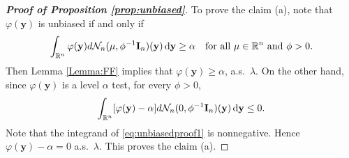 \documentclass[11pt]{article}
\DeclareMathOperator{\myRank}{Rank}
\DeclareMathOperator{\myE}{E}
\newcommand{\By}{\mathbf{y}}    \newcommand{\Bz}{\mathbf{z}}
\theoremstyle{plain}
\theoremstyle{definition}
\theoremstyle{remark}
\begin{document}
\begin{proof}[\textbf{Proof of Proposition \ref{prop:unbiased}}]
    
    To prove the claim (a), 
    note that $\varphi(\By)$ is unbiased if and only if
    \begin{equation*}
        \int_{\mathbb R^n} \varphi(\By) d\mathcal N_n (\mu,\phi^{-1} \BI_n) (\By) \,\mathrm{d} \By\geq \alpha
        \quad \text{for all $\mu\in \mathbb R^n$ and $\phi>0$}.
    \end{equation*}
    Then Lemma \ref{Lemma:FF} implies that $\varphi(\By) \geq \alpha$, a.s.\ $\lambda$.
    On the other hand, since $\varphi(\By)$ is a level $\alpha$ test, for every $\phi>0$,
    \begin{equation}\label{eq:unbiasedproof1}
        \int_{\mathbb R^n} [\varphi(\By)-\alpha] d\mathcal N_n (0,\phi^{-1} \BI_n)(\By) \,\mathrm{d} \By\leq 0.
    \end{equation}
    Note that the integrand of \eqref{eq:unbiasedproof1} is nonnegative. Hence $\varphi(\By)-\alpha=0$ a.s.\ $\lambda$.
    This proves the claim (a). 


\end{proof}
\end{document}
